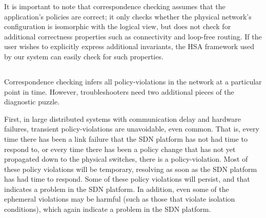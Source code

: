 
It is important to note that correspondence checking assumes that the
application's policies are correct; it only checks whether the physical
network's configuration is isomorphic with the logical view, but does not
check for additional correctness properties such as connectivity and
loop-free routing. If the user wishes to explicitly express additional
invariants, the HSA framework used by our system can
easily check for such properties.

\subsection{\SIMULATOR{}}


Correspondence checking infers all policy-violations in the network at a
particular point in time. However, troubleshooters
need two additional pieces of the diagnostic puzzle.

First, in large distributed
systems with communication delay and hardware failures, transient policy-violations
are unavoidable, even common. That is, every time there has been a link failure that the SDN platform has not had time to respond to, or every time there has been a policy change that has not yet propagated down to the physical switches, there is a policy-violation.  Most of these policy violations will be temporary, resolving as soon as the SDN platform has had time to respond.  Some of these policy violations will persist, and that indicates a problem in the SDN platform.  In addition, even some of the ephemeral violations may be harmful (such as those that violate isolation conditions), which again indicate a problem in the SDN platform.

